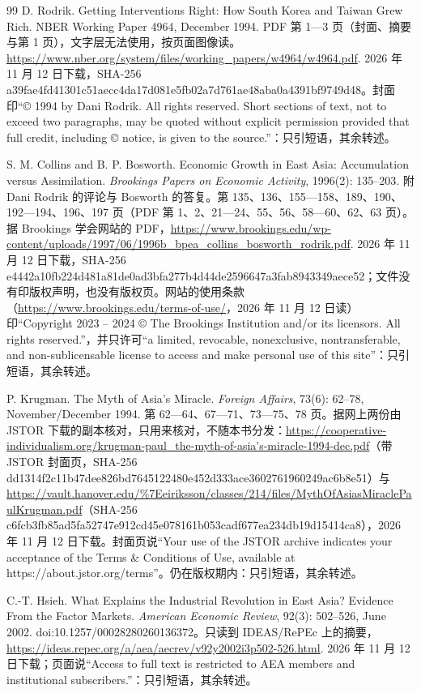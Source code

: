 \begin{thebibliography}{99}
 D. Rodrik. Getting Interventions Right: How South Korea and Taiwan Grew Rich. NBER Working Paper 4964, December 1994. PDF 第 1—3 页（封面、摘要与第 1 页），文字层无法使用，按页面图像读。\url{https://www.nber.org/system/files/working_papers/w4964/w4964.pdf}. 2026 年 11 月 12 日下载，SHA-256 a39fae4fd41301c51aecc4da17d081e5fb02a7d761ae48aba0a4391bf9749d48。封面印“© 1994 by Dani Rodrik. All rights reserved. Short sections of text, not to exceed two paragraphs, may be quoted without explicit permission provided that full credit, including © notice, is given to the source.”：只引短语，其余转述。

 S. M. Collins and B. P. Bosworth. Economic Growth in East Asia: Accumulation versus Assimilation. \emph{Brookings Papers on Economic Activity}, 1996(2): 135--203. 附 Dani Rodrik 的评论与 Bosworth 的答复。第 135、136、155—158、189、190、192—194、196、197 页（PDF 第 1、2、21—24、55、56、58—60、62、63 页）。据 Brookings 学会网站的 PDF，\url{https://www.brookings.edu/wp-content/uploads/1997/06/1996b_bpea_collins_bosworth_rodrik.pdf}. 2026 年 11 月 12 日下载，SHA-256 e4442a10fb224d481a81de0ad3bfa277b4d44de2596647a3fab8943349aece52；文件没有印版权声明，也没有版权页。网站的使用条款（\url{https://www.brookings.edu/terms-of-use/}，2026 年 11 月 12 日读）印“Copyright 2023 – 2024 © The Brookings Institution and/or its licensors. All rights reserved.”，并只许可“a limited, revocable, nonexclusive, nontransferable, and non-sublicensable license to access and make personal use of this site”：只引短语，其余转述。

 P. Krugman. The Myth of Asia's Miracle. \emph{Foreign Affairs}, 73(6): 62--78, November/December 1994. 第 62—64、67—71、73—75、78 页。据网上两份由 JSTOR 下载的副本核对，只用来核对，不随本书分发：\url{https://cooperative-individualism.org/krugman-paul_the-myth-of-asia's-miracle-1994-dec.pdf}（带 JSTOR 封面页，SHA-256 dd1314f2c11b47dee826bd7645122480e452d333ace3602761960249ac6b8e51）与 \url{https://vault.hanover.edu/\%7Eeiriksson/classes/214/files/MythOfAsiasMiraclePaulKrugman.pdf}（SHA-256 c6fcb3fb85ad5fa52747e912cd45e078161b053cadf677ea234db19d15414ca8），2026 年 11 月 12 日下载。封面页说“Your use of the JSTOR archive indicates your acceptance of the Terms \& Conditions of Use, available at https://about.jstor.org/terms”。仍在版权期内：只引短语，其余转述。

 C.-T. Hsieh. What Explains the Industrial Revolution in East Asia? Evidence From the Factor Markets. \emph{American Economic Review}, 92(3): 502--526, June 2002. doi:10.1257/00028280260136372。只读到 IDEAS/RePEc 上的摘要，\url{https://ideas.repec.org/a/aea/aecrev/v92y2002i3p502-526.html}. 2026 年 11 月 12 日下载；页面说“Access to full text is restricted to AEA members and institutional subscribers.”：只引短语，其余转述。


\end{thebibliography}
